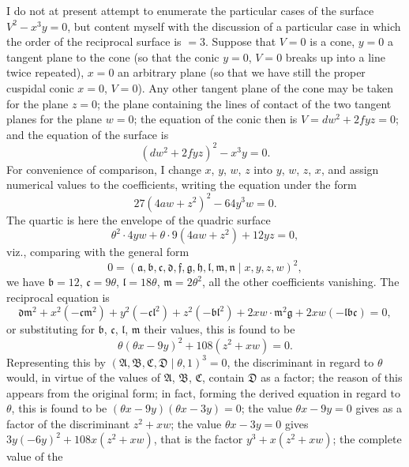 \documentclass[11pt,a4paper]{article}
\providecommand{\midbar}{\mid}
\begin{document}
\medskip

I do not at present attempt to enumerate the particular cases of the
surface $V^{2} - x^{3} y = 0$, but content myself with the discussion of
a particular case in which the order of the reciprocal surface is $= 3$.
Suppose that $V = 0$ is a cone, $y = 0$ a tangent plane to the cone (so
that the conic $y = 0$, $V = 0$ breaks up into a line twice repeated),
$x = 0$ an arbitrary plane (so that we have still the proper cuspidal
conic $x = 0$, $V = 0$). Any other tangent plane of the cone may be taken
for the plane $z = 0$; the plane containing the lines of contact of the
two tangent planes for the plane $w = 0$; the equation of the conic then
is $V = d w^{2} + 2 f y z = 0$; and the equation of the surface is
\[
(d w^{2} + 2 f y z)^{2} - x^{3} y = 0. \tag{AB}
\]
For convenience of comparison, I change $x$, $y$, $w$, $z$ into $y$, $w$,
$z$, $x$, and assign numerical values to the coefficients, writing the
equation under the form
\[
27 (4 a w + z^{2})^{2} - 64 y^{3} w = 0. \tag{AB}
\]
The quartic is here the envelope of the quadric surface
\[
\theta^{2} \cdot 4 y w + \theta \cdot 9 (4 a w + z^{2}) + 12 y z = 0,
\]
viz., comparing with the general form
\[
0 = (\mathfrak{a}, \mathfrak{b}, \mathfrak{c}, \mathfrak{d},
\mathfrak{f}, \mathfrak{g}, \mathfrak{h}, \mathfrak{l},
\mathfrak{m}, \mathfrak{n}\!\midbar\! x, y, z, w)^{2},
\]
we have $\mathfrak{b} = 12$, $\mathfrak{c} = 9\theta$,
$\mathfrak{l} = 18\theta$, $\mathfrak{m} = 2\theta^{2}$, all the other
coefficients vanishing. The reciprocal equation is
\[
\mathfrak{d}\mathfrak{m}^{2}
+ x^{2}(-\mathfrak{c}\mathfrak{m}^{2})
+ y^{2}(-\mathfrak{c}\mathfrak{l}^{2})
+ z^{2}(-\mathfrak{b}\mathfrak{l}^{2})
+ 2 x w \cdot \mathfrak{m}^{2} \mathfrak{g}
+ 2 x w (-\mathfrak{l}\mathfrak{b}\mathfrak{c}) = 0,
\]
or substituting for $\mathfrak{b}$, $\mathfrak{c}$, $\mathfrak{l}$,
$\mathfrak{m}$ their values, this is found to be
\[
\theta (\theta x - 9 y)^{2} + 108 (z^{2} + x w) = 0.
\]
Representing this by $(\mathfrak{A}, \mathfrak{B}, \mathfrak{C},
\mathfrak{D}\!\midbar\! \theta, 1)^{3} = 0$, the discriminant in regard
to $\theta$ would, in virtue of the values of $\mathfrak{A}$,
$\mathfrak{B}$, $\mathfrak{C}$, contain $\mathfrak{D}$ as a factor; the
reason of this appears from the original form; in fact, forming the
derived equation in regard to $\theta$, this is found to be
$(\theta x - 9 y)(\theta x - 3 y) = 0$; the value $\theta x - 9 y = 0$
gives as a factor of the discriminant $z^{2} + x w$; the value
$\theta x - 3 y = 0$ gives $3 y (-6 y)^{2} + 108 x (z^{2} + x w)$, that
is the factor $y^{3} + x(z^{2} + x w)$; the complete value of the
\end{document}
